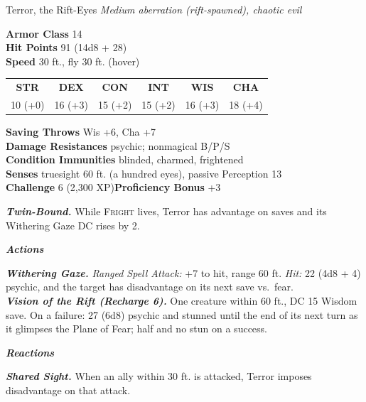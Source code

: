 \documentclass[10pt,twoside]{article}
\newcommand{\abilities}[6]{%
\begin{center}\small
\setlength{\tabcolsep}{6pt}\renewcommand{\arraystretch}{1.05}
\begin{tabular}{cccccc}
\textbf{STR}&\textbf{DEX}&\textbf{CON}&\textbf{INT}&\textbf{WIS}&\textbf{CHA}\\[1pt]
#1&#2&#3&#4&#5&#6\\
\end{tabular}\end{center}}
\newcommand{\sbrule}{\par\vspace{2pt}\noindent{\color{bloodred}\rule{\linewidth}{1.1pt}}\par\vspace{2pt}}
\newcommand{\eqname}[1]{\textsc{#1}}
\begin{document}
\begin{statblock}{Terror, the Rift-Eyes}
\textit{Medium aberration (rift-spawned), chaotic evil}\sbrule
\textbf{Armor Class} 14\\
\textbf{Hit Points} 91 (14d8 + 28)\\
\textbf{Speed} 30 ft., fly 30 ft. (hover)\sbrule
\abilities{10 (+0)}{16 (+3)}{15 (+2)}{15 (+2)}{16 (+3)}{18 (+4)}
\sbrule
\textbf{Saving Throws} Wis +6, Cha +7\\
\textbf{Damage Resistances} psychic; nonmagical B/P/S\\
\textbf{Condition Immunities} blinded, charmed, frightened\\
\textbf{Senses} truesight 60 ft. (a hundred eyes), passive Perception 13\\
\textbf{Challenge} 6 (2,300 XP)\hfill\textbf{Proficiency Bonus} +3\sbrule
\textbf{\textit{Twin-Bound.}} While \eqname{Fright} lives, Terror has advantage on
saves and its Withering Gaze DC rises by 2.\sbrule
\textit{\textbf{Actions}}\par
\textbf{\textit{Withering Gaze.}} \textit{Ranged Spell Attack:} +7 to hit, range 60
ft. \textit{Hit:} 22 (4d8 + 4) psychic, and the target has disadvantage on its next
save vs.\ fear.\\
\textbf{\textit{Vision of the Rift (Recharge 6).}} One creature within 60 ft., DC 15
Wisdom save. On a failure: 27 (6d8) psychic and stunned until the end of its next turn
as it glimpses the Plane of Fear; half and no stun on a success.\sbrule
\textit{\textbf{Reactions}}\par
\textbf{\textit{Shared Sight.}} When an ally within 30 ft. is attacked, Terror imposes
disadvantage on that attack.
\end{statblock}
\end{document}
